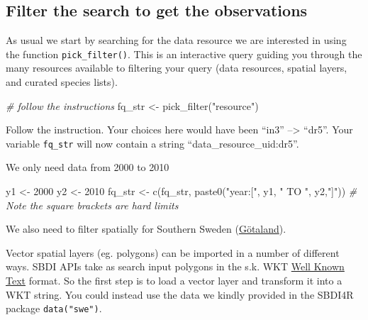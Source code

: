 \documentclass[
  10pt,
]{article}
\newenvironment{Shaded}{\begin{snugshade}}{\end{snugshade}}
\newcommand{\CommentTok}[1]{\textcolor[rgb]{0.56,0.35,0.01}{\textit{#1}}}
\newcommand{\DecValTok}[1]{\textcolor[rgb]{0.00,0.00,0.81}{#1}}
\newcommand{\FunctionTok}[1]{\textcolor[rgb]{0.00,0.00,0.00}{#1}}
\newcommand{\NormalTok}[1]{#1}
\newcommand{\OtherTok}[1]{\textcolor[rgb]{0.56,0.35,0.01}{#1}}
\newcommand{\StringTok}[1]{\textcolor[rgb]{0.31,0.60,0.02}{#1}}
\begin{document}
\hypertarget{filter-the-search-to-get-the-observations}{%
\subsection{Filter the search to get the observations}\label{filter-the-search-to-get-the-observations}}

As usual we start by searching for the data resource we are interested in using
the function \texttt{pick\_filter()}. This is an interactive query guiding you through
the many resources available to filtering your query (data resources, spatial
layers, and curated species lists).

\begin{Shaded}
\begin{Highlighting}[]
\CommentTok{\# follow the instructions }
\NormalTok{fq\_str }\OtherTok{\textless{}{-}} \FunctionTok{pick\_filter}\NormalTok{(}\StringTok{"resource"}\NormalTok{) }
\end{Highlighting}
\end{Shaded}

Follow the instruction. Your choices here would have been ``in3'' --\textgreater{} ``dr5''.
Your variable \texttt{fq\_str} will now contain a string ``data\_resource\_uid:dr5''.

We only need data from 2000 to 2010

\begin{Shaded}
\begin{Highlighting}[]
\NormalTok{y1 }\OtherTok{\textless{}{-}} \DecValTok{2000}
\NormalTok{y2 }\OtherTok{\textless{}{-}} \DecValTok{2010}
\NormalTok{fq\_str }\OtherTok{\textless{}{-}} \FunctionTok{c}\NormalTok{(fq\_str, }\FunctionTok{paste0}\NormalTok{(}\StringTok{"year:["}\NormalTok{, y1, }\StringTok{" TO "}\NormalTok{, y2,}\StringTok{"]"}\NormalTok{))}
\CommentTok{\# Note the square brackets are hard limits}
\end{Highlighting}
\end{Shaded}

We also need to filter spatially for Southern Sweden (\href{https://en.wikipedia.org/wiki/G\%C3\%B6taland}{Götaland}).

Vector spatial layers (eg. polygons) can be imported in a number of different ways.
SBDI APIs take as search input polygons in the s.k. WKT \href{https://www.geoapi.org/3.0/javadoc/org/opengis/referencing/doc-files/WKT.html}{Well Known Text}
format. So the first step is to load a vector layer and transform it into a WKT string.
You could instead use the data we kindly provided in the SBDI4R package \texttt{data("swe")}.
\end{document}
